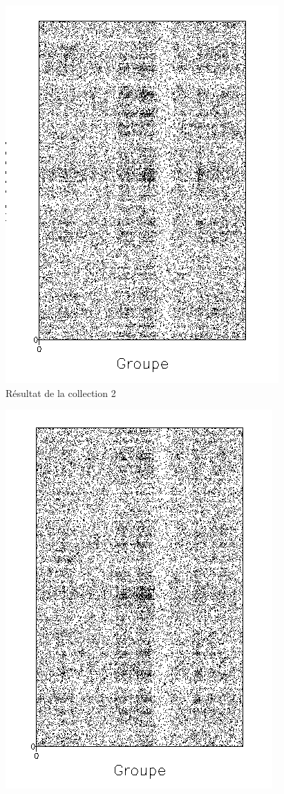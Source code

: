 \begin{figure}[!ht]
	\begin{minipage}[r]{.46\linewidth}
		\begin{center}
		\includegraphics[scale=0.7]{../res/cible2.png}
		Résultat de la collection 2
	\end{center}
\end{minipage} \hfill
\begin{minipage}[c]{.46 \linewidth}
	\begin{center}
			\includegraphics[scale=0.7]{../res/cible2-ic.png}

\end{center}
\end{minipage}
\end{figure}
